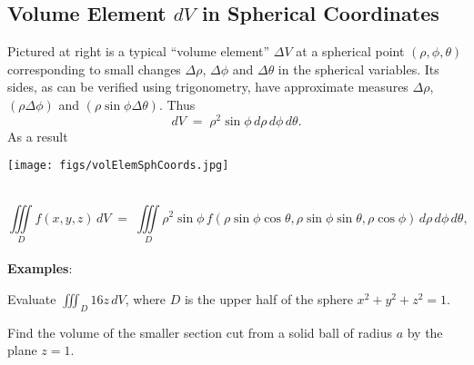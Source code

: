 \documentclass[12pt,fleqn]{article}
\def\egs#1{{\bf Examples}: #1}
\begin{document}
\vspace{0.2in}
\subsection*{Volume Element $dV$ in Spherical Coordinates}
\begin{minipage}[t]{4.5in}
  Pictured at right is a typical ``volume element'' $\Delta V$
  at a spherical point $(\rho, \phi, \theta)$ corresponding to
  small changes $\Delta\rho$, $\Delta\phi$ and $\Delta\theta$
  in the spherical variables.  Its sides, as can be verified
  using trigonometry, have approximate measures $\Delta\rho$,
  $(\rho\Delta\phi)$ and $(\rho\sin\phi\Delta\theta)$.  Thus
  $$ dV \;=\; \rho^2\sin\phi\,d\rho\,d\phi\,d\theta. $$
  As a result
\end{minipage}\hspace{0.2in}
\begin{minipage}[t]{2.0in}
  \mbox{}

  \vspace{-0.6in}
  \texttt{[image: figs/volElemSphCoords.jpg]}
\end{minipage}\\
$$ \iiint\limits_D f(x,y,z)\,dV \;=\; \iiint\limits_D
	\rho^2\sin\phi\,f(\rho\sin\phi\cos\theta, \rho\sin\phi\sin\theta,
	\rho\cos\phi) \,d\rho\,d\phi\,d\theta, $$\\[16pt]
\egs{}
\be
\item
  Evaluate $\iiint_D 16z\,dV$, where $D$ is the upper half of
  the sphere $x^2 + y^2 + z^2 = 1$.
\item
  Find the volume of the smaller section cut from a solid ball
  of radius $a$ by the plane $z=1$.
\ee
\end{document}
